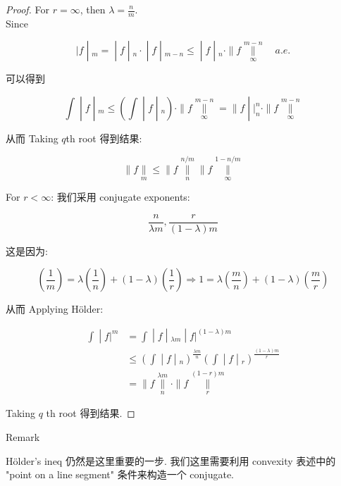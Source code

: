 \documentclass{qlnotes-export}
\begin{document}
\begin{proof}

For \(r = \infty\), then \(\lambda = \frac{n}{m}\).\\
Since

\[\left. |f \middle| {}_{m} = \middle| f \middle| {}_{n} \cdot \middle| f \middle| {}_{m - n} \leq \middle| f \middle| {}_{n} \cdot \parallel f\underset{\infty}{\overset{m - n}{\parallel}}\quad a.e. \right.\]

可以得到

\[\left. \int \middle| f \middle| {}_{m} \leq (\int \middle| f \middle| {}_{n}) \cdot \parallel f\underset{\infty}{\overset{m - n}{\parallel}} = \parallel f \middle| |_{n}^{n} \cdot \parallel f\underset{\infty}{\overset{m - n}{\parallel}} \right.\]

从而 Taking \(q\)th root 得到结果:

\[\parallel f\underset{m}{\parallel} \leq \parallel f\underset{n}{\overset{n/m}{\parallel}} \parallel f\underset{\infty}{\overset{1 - n/m}{\parallel}}\]

For \(r < \infty\): 我们采用 conjugate exponents:

\[\frac{n}{\lambda m},\frac{r}{(1 - \lambda)m}\]

这是因为:

\[(\frac{1}{m}) = \lambda(\frac{1}{n}) + (1 - \lambda)(\frac{1}{r})\Longrightarrow 1 = \lambda(\frac{m}{n}) + (1 - \lambda)(\frac{m}{r})\]

从而 Applying Hölder:

\[\begin{matrix}
\left. \int \middle| f|^{m} \right. & \left. = \int \middle| f \middle| {}_{\lambda m} \middle| f|^{(1 - \lambda)m} \right. \\
 & \left. \leq (\int \middle| f \middle| {}_{n})^{\frac{\lambda m}{n}}(\int \middle| f \middle| {}_{r})^{\frac{(1 - \lambda)m}{r}} \right. \\
 & {= \parallel f\underset{n}{\overset{\lambda m}{\parallel}} \cdot \parallel f\underset{r}{\overset{(1 - r)m}{\parallel}}}
\end{matrix}\]

Taking \(q\) th root 得到结果.

\end{proof}

\begin{qlremark}{Remark}

Hölder's ineq 仍然是这里重要的一步. 我们这里需要利用 convexity 表述中的 "point on a line segment" 条件来构造一个 conjugate.

\end{qlremark}
\end{document}
